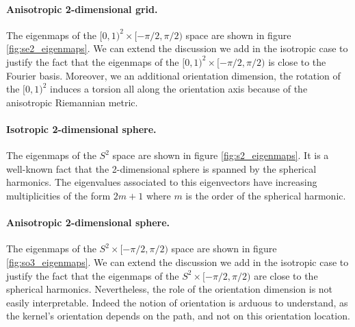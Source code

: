\documentclass{article}
\begin{document}
\paragraph{Anisotropic 2-dimensional grid.} The eigenmaps of the $[0,1)^2 \times [-\pi/2, \pi/2)$ space are shown in figure \ref{fig:se2_eigenmaps}. We can extend the discussion we add in the isotropic case to justify the fact that the eigenmaps of the $[0,1)^2 \times [-\pi/2, \pi/2)$ is close to the Fourier basis. Moreover, we an additional orientation dimension, the rotation of the $[0,1)^2$ induces a torsion all along the orientation axis because of the anisotropic Riemannian metric.

\paragraph{Isotropic 2-dimensional sphere.} The eigenmaps of the $S^2$ space are shown in figure \ref{fig:s2_eigenmaps}. It is a well-known fact that the 2-dimensional sphere is spanned by the spherical harmonics. The eigenvalues associated to this eigenvectors have increasing multiplicities of the form $2m + 1$ where $m$ is the order of the spherical harmonic.

\paragraph{Anisotropic 2-dimensional sphere.} The eigenmaps of the $S^2 \times [-\pi/2, \pi/2)$ space are shown in figure \ref{fig:so3_eigenmaps}. We can extend the discussion we add in the isotropic case to justify the fact that the eigenmaps of the $S^2 \times [-\pi/2, \pi/2)$ are close to the spherical harmonics. Nevertheless, the role of the orientation dimension is not easily interpretable. Indeed the notion of orientation is arduous to understand, as the kernel's orientation depends on the path, and not on this orientation location.

\clearpage
\end{document}
